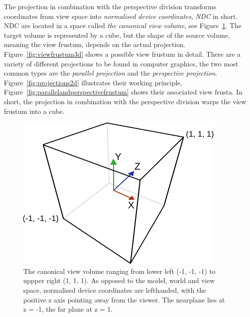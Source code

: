 The projection in combination with the perspective division transforms
coordinates from view space into \textit{normalised device coordinates},
\textit{NDC} in short. NDC are located in a space called \textit{the canonical
view volume}, see Figure~\ref{fig:canonicalviewvolume}. The target volume is
represented by a cube, but the shape of the source volume, meaning the view
frustum, depends on the actual projection. Figure~\ref{fig:viewfrustum3d} shows
a possible view frustum in detail. There are a variety of different projections
to be found in computer graphics, the two most common types are the
\textit{parallel projection} and the \textit{perspective projection}.
Figure~\ref{fig:projections2d} illustrates their working principle,
Figure~\ref{fig:parallelandperspectivefrustum} shows their associated view
frusta. In short, the projection in combination with the perspective division
warps the view frustum into a cube.
\begin{figure}
\begin{center}
\includegraphics[scale=0.8]{Images/CanonicalCube.pdf}
\caption[The canonical view volume]{The canonical view volume ranging from lower
left (-1, -1, -1) to uppper right (1, 1, 1). As opposed to the model, world and
view space, normalised device coordinates are lefthanded, with the positive z
axis pointing away from the viewer. The nearplane lies at z = -1, the far plane
at z = 1.}
\label{fig:canonicalviewvolume}
\end{center}
\end{figure}
